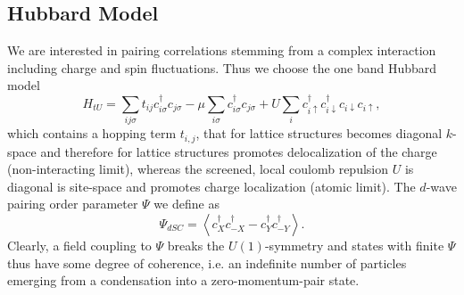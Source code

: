\documentclass[aps,prb,twocolumn,groupedaddress,amsmath,amssymb]{revtex4-1}
\newcommand{\up}{\uparrow}
\newcommand{\dn}{\downarrow}
\begin{document}
\subsection{Hubbard Model}
We are interested in pairing correlations stemming from a complex interaction including charge and spin fluctuations. Thus we choose the one band Hubbard model \cite{Hubbard1963}
\begin{equation}
  \label{eq:hubbard}
  H_{tU}=\sum_{ij\sigma}t_{ij}c^{\dagger}_{i\sigma}c_{j\sigma}-\mu\sum_{i\sigma}c^{\dagger}_{i\sigma}c_{j\sigma}+U\sum_ic^{\dagger}_{i\up}c^{\dagger}_{i\dn}c_{i\dn}c_{i\up},
\end{equation}
which contains a hopping term $t_{i,j}$, that for lattice structures becomes diagonal $k$-space and therefore for lattice structures promotes delocalization of the charge (non-interacting limit), whereas the screened, local coulomb repulsion $U$ is diagonal is site-space and promotes charge localization (atomic limit). 
The $d$-wave pairing order parameter $\Psi$ we define as
\begin{equation}
  \label{eq:dwaveop}
  \Psi_{dSC} = \left< c^\dagger_X c^\dagger_{-X} - c^\dagger_Y c^\dagger_{-Y}\right>.
\end{equation}
Clearly, a field coupling to $\Psi$ breaks the $U(1)$-symmetry and states with finite $\Psi$ thus have some degree of coherence, i.e. an indefinite number of particles emerging from a condensation into a zero-momentum-pair state.\cite{AlexanderAltland2010,HenrikBruus2004}
\end{document}
